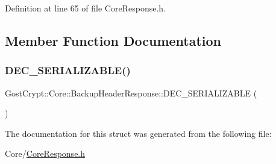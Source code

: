 Definition at line 65 of file Core\+Response.\+h.



\subsection{Member Function Documentation}
\mbox{\label{struct_gost_crypt_1_1_core_1_1_backup_header_response_a1fbac9f6758193b7871db184b2179acf}} 
\subsubsection{\texorpdfstring{D\+E\+C\+\_\+\+S\+E\+R\+I\+A\+L\+I\+Z\+A\+B\+L\+E()}{DEC\_SERIALIZABLE()}}
{\footnotesize\ttfamily Gost\+Crypt\+::\+Core\+::\+Backup\+Header\+Response\+::\+D\+E\+C\+\_\+\+S\+E\+R\+I\+A\+L\+I\+Z\+A\+B\+LE (\begin{DoxyParamCaption}\item[{\hyperlink{struct_gost_crypt_1_1_core_1_1_backup_header_response}{Backup\+Header\+Response}}]{ }\end{DoxyParamCaption})}



The documentation for this struct was generated from the following file\+:\begin{DoxyCompactItemize}
\item 
Core/\hyperlink{_core_response_8h}{Core\+Response.\+h}\end{DoxyCompactItemize}
